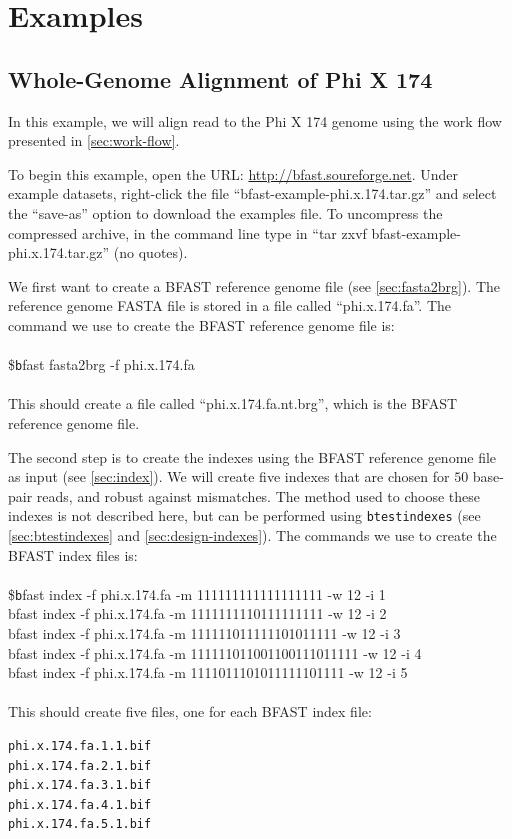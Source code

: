 \documentclass[a4paper,12pt]{book}
\newcommand{\TT}[1]{{\tt #1}} %
\newenvironment{script}{\\\\\footnotesize\$\TT}{\normalsize\\\\}
\newcommand{\rGFF}{reference genome FASTA file}
\newcommand{\BRGF}{BFAST reference genome file} %
\newcommand{\BIF}{BFAST index file} %
\begin{document}
\chapter{Examples}
\section{Whole-Genome Alignment of Phi X 174}
\label{sec:phi}
In this example, we will align read to the Phi X 174 genome using the work flow presented in \autoref{sec:work-flow}.

To begin this example, open the URL: \url{http://bfast.soureforge.net}.
Under example datasets, right-click the file ``bfast-example-phi.x.174.tar.gz'' and select the ``save-as'' option to download the examples file.
To uncompress the compressed archive, in the command line type in ``tar zxvf bfast-example-phi.x.174.tar.gz'' (no quotes).

We first want to create a \BRGF{} (see \autoref{sec:fasta2brg}).
The \rGFF{} is stored in a file called ``phi.x.174.fa''.
The command we use to create the \BRGF{} is:
\begin{script}
	bfast fasta2brg -f phi.x.174.fa 
\end{script}
This should create a file called ``phi.x.174.fa.nt.brg'', which is the \BRGF{}.

The second step is to create the indexes using the \BRGF{} as input (see \autoref{sec:index}).
We will create five indexes that are chosen for $50$ base-pair reads, and robust against mismatches.
The method used to choose these indexes is not described here, but can be performed using \TT{btestindexes} (see \autoref{sec:btestindexes} and \autoref{sec:design-indexes}).
The commands we use to create the \BIF{s} is:
\begin{script}
	bfast index -f phi.x.174.fa -m 111111111111111111 -w 12 -i 1
	\\
	bfast index -f phi.x.174.fa -m 1111111110111111111 -w 12 -i 2
	\\
	bfast index -f phi.x.174.fa -m 111111011111101011111 -w 12 -i 3
	\\
	bfast index -f phi.x.174.fa -m 111111011001100111011111 -w 12 -i 4
	\\
	bfast index -f phi.x.174.fa -m 1111011101011111101111 -w 12 -i 5
\end{script}
This should create five files, one for each \BIF{}:
\begin{verbatim}
phi.x.174.fa.1.1.bif
phi.x.174.fa.2.1.bif
phi.x.174.fa.3.1.bif
phi.x.174.fa.4.1.bif
phi.x.174.fa.5.1.bif
\end{verbatim}
\end{document}
